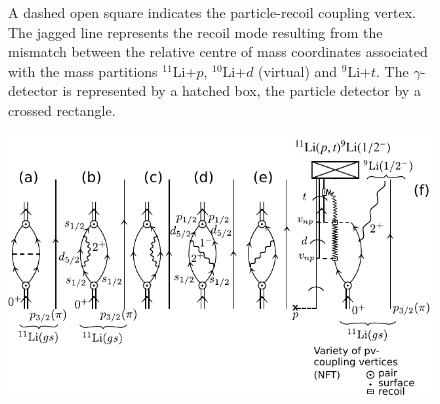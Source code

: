 \begin{figure}
{              	 A dashed open square  indicates the particle-recoil coupling vertex.
              	   The jagged line  represents the recoil  mode resulting from the mismatch between the relative centre of mass coordinates  associated with  the mass partitions $^{11}$Li+$p$, $^{10}$Li+$d$ (virtual) and  $^9$Li+$t$. 
              	 The $\gamma$-detector is represented by a hatched box, the  particle detector  by a crossed rectangle. }
          \label{fig1.9.3}
          \end{figure}
          \begin{figure}
          \centerline {
          \includegraphics*[width=12cm]{introduccion/figs/figintro5xx}
          }

\end{figure}
